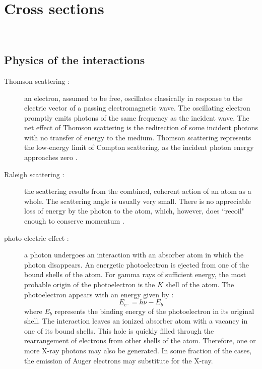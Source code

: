 \section{Cross sections}
\\
\subsection{Physics of the interactions}

\begin{description}
\item [Thomson scattering :] an electron, assumed to be free, oscillates
classically in response to the electric vector of a passing electromagnetic
wave. The oscillating electron promptly emits photons of the same frequency as
the incident wave. The net effect of Thomson scattering is the redirection of
some incident photons with no transfer of energy to the medium. Thomson
scattering represents the low-energy limit of Compton scattering, as the
incident photon energy approaches zero \cite{radiation}.
\item [Raleigh scattering :] the scattering results from the combined,
coherent action of an atom as a whole. The scattering angle is usually very
small. There is no appreciable loss of energy by the photon to the atom,
which, however, does ``recoil" enough to conserve momentum \cite{radiation}.
\item [photo-electric effect :] a photon undergoes an interaction with an
absorber atom in which the photon disappears. An energetic photoelectron is
ejected from one of the bound shells of the atom. For gamma rays of
sufficient energy, the most probable origin of the photoelectron is the $K$
shell of the atom. The photoelectron appears with an energy given by :
\begin{equation}
E_{e^-} = h\nu -E_b
\end{equation}
where $E_b$ represents the binding energy of the photoelectron in its original
shell. The interaction leaves an ionized absorber atom with a vacancy in one
of its bound shells. This hole is quickly filled through the rearrangement of
electrons from other shells of the atom. Therefore, one or more X-ray photons
may also be generated. In some fraction of the cases, the emission of Auger
electrons may substitute for the X-ray. 
\begin{figure}[H]
\centering

\end{figure}
\end{description}
